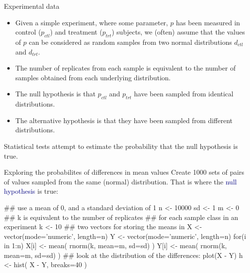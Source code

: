 \documentclass[pdf]{beamer}
\begin{document}
\begin{frame}{Experimental data}
  \begin{itemize}
  \item Given a simple experiment, where some parameter, $p$ has been measured in
    control ($p_{ctl}$) and treatment ($p_{trt}$) subjects, we (often) assume that the
    values of $p$ can be
    considered as random samples from two normal distributions
    $d_{ctl}$ and $d_{trt}$.
  \item The number of replicates from each sample is equivalent to the number
    of samples obtained from each underlying distribution.
  \item The null hypothesis is that $p_{ctl}$ and $p_{trt}$ have been sampled
    from identical distributions.
  \item The alternative hypothesis is that they have been sampled from different
    distributions.
  \end{itemize}
  
  Statistical tests attempt to estimate the probability that the null
  hypothesis is true.
\end{frame}


\begin{frame}[fragile]{Exploring the probabilites of differences in mean values}
  Create 1000 sets of pairs of values sampled from the same (normal)
  distribution. That is where the \textcolor{navy}{null hypothesis} is true:
  \begin{rcode}
    ## use a mean of 0, and a standard deviation of 1
    n <- 10000
    sd <- 1
    m <- 0
    ## k is equivalent to the number of replicates 
    ## for each sample class in an experiment
    k <- 10
    ## two vectors for storing the means in
    X <- vector(mode='numeric', length=n)
    Y <- vector(mode='numeric', length=n)
    for(i in 1:n){
      X[i] <- mean( rnorm(k, mean=m, sd=sd) )
      Y[i] <- mean( rnorm(k, mean=m, sd=sd) )
    }
    ## look at the distribution of the differences:
    plot(X - Y)
    h <- hist( X - Y, breaks=40 )
  \end{rcode}

\end{frame}
\end{document}
